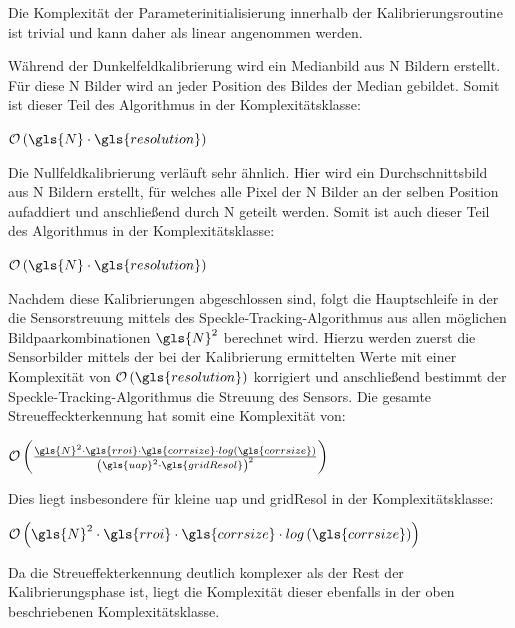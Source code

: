 Die Komplexität der Parameterinitialisierung innerhalb der Kalibrierungsroutine ist trivial und kann daher als linear angenommen werden. 

Während der Dunkelfeldkalibrierung wird ein Medianbild aus \gls{N} Bildern erstellt. Für diese \gls{N} Bilder wird an jeder Position des Bildes der Median gebildet. Somit ist dieser Teil des Algorithmus in der Komplexitätsklasse:

\begin{center}
	$\mathcal{O}\left(\gls{N} \cdot \gls{resolution}\right)$
\end{center}

Die Nullfeldkalibrierung verläuft sehr ähnlich. Hier wird ein Durchschnittsbild aus \gls{N} Bildern erstellt, für welches alle Pixel  der \gls{N} Bilder an der selben Position aufaddiert und anschließend durch \gls{N} geteilt werden. Somit ist auch dieser Teil des Algorithmus in der Komplexitätsklasse:

\begin{center}
	$\mathcal{O}\left(\gls{N} \cdot \gls{resolution}\right)$
\end{center}

Nachdem diese Kalibrierungen abgeschlossen sind, folgt die Hauptschleife in der die Sensorstreuung mittels des Speckle-Tracking-Algorithmus aus allen möglichen Bildpaarkombinationen $\gls{N}^2$ berechnet wird. Hierzu werden zuerst die Sensorbilder mittels der bei der Kalibrierung ermittelten Werte mit einer Komplexität von $\mathcal{O}\left(\gls{resolution}\right)$ korrigiert und anschließend bestimmt der Speckle-Tracking-Algorithmus die Streuung des Sensors. Die gesamte Streueffeckterkennung hat somit eine Komplexität von: 

\begin{center}
	$\mathcal{O}\left(\frac{\gls{N}^2 \cdot\gls{rroi} \cdot \gls{corrsize} \cdot log\left(\gls{corrsize}\right)}{\left(\gls{uap}^2 \cdot \gls{gridResol}\right)^2}\right)$
\end{center}

Dies liegt insbesondere für kleine \gls{uap} und \gls{gridResol} in der Komplexitätsklasse:

\begin{center}
	$\mathcal{O}\left(\gls{N}^2 \cdot\gls{rroi} \cdot \gls{corrsize} \cdot log\left(\gls{corrsize}\right)\right)$
\end{center}

Da die Streueffekterkennung deutlich komplexer als der Rest der Kalibrierungsphase ist, liegt die Komplexität dieser ebenfalls in der oben beschriebenen Komplexitätsklasse. 

